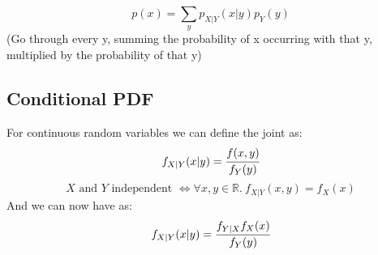 \documentclass{report}
\begin{document}
 {
	\[p(x) = \sum_yp_{X|Y}(x|y)p_Y(y)\]
	(Go through every y, summing the probability of x occurring with that y, multiplied by the probability of that y)
}
\subsection*{Conditional PDF}
For continuous random variables we can define the joint  as:
\[f_{X|Y}(x|y) = \cfrac{f(x,y)}{f_Y(y)}\]
\[\text{$X$ and $Y$ independent } \Leftrightarrow \forall x,y \in \mathbb{R}. \ f_{X|Y}(x,y) = f_X(x)\]
And we can now have  as:
\[f_{X|Y}(x|y) = \cfrac{f_{Y|X} f_X(x)}{f_Y(y)}\]

\end{document}
